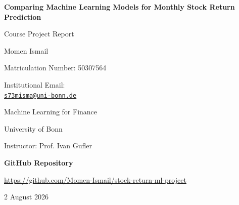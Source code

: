 \documentclass[11pt,a4paper]{article}
\newcommand{\papertitle}{Comparing Machine Learning Models for Monthly Stock Return Prediction}
\begin{document}


\begin{titlepage}
\thispagestyle{empty}
\centering

\vspace*{2.2cm}

{\LARGE\bfseries
\papertitle
\par}

\vspace{1.2cm}

{\Large Course Project Report\par}

\vspace{1.4cm}

{\large
Momen Ismail\par
}

\vspace{0.35cm}

{\large
Matriculation Number: 50307564\par
}

\vspace{0.35cm}

{\large
Institutional Email:\\[0.15cm]
\texttt{\href{mailto:s73misma@uni-bonn.de}{s73misma@uni-bonn.de}}
\par
}

\vspace{1.2cm}

{\large
Machine Learning for Finance\par
University of Bonn\par
Instructor: Prof. Ivan Gufler
\par
}

\vfill

\textbf{GitHub Repository}

\vspace{0.25cm}

\url{https://github.com/Momen-Ismail/stock-return-ml-project}

\vfill

2 August 2026

\end{titlepage}

\clearpage
{}
\end{document}
